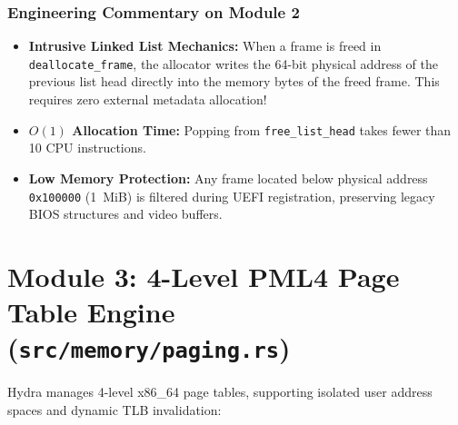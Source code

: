 \subsubsection*{Engineering Commentary on Module 2}
\begin{itemize}
    \item \textbf{Intrusive Linked List Mechanics:} When a frame is freed in \texttt{deallocate\_frame}, the allocator writes the 64-bit physical address of the previous list head directly into the memory bytes of the freed frame. This requires zero external metadata allocation!
    \item \textbf{$O(1)$ Allocation Time:} Popping from \texttt{free\_list\_head} takes fewer than 10 CPU instructions.
    \item \textbf{Low Memory Protection:} Any frame located below physical address \texttt{0x100000} (1~MiB) is filtered during UEFI registration, preserving legacy BIOS structures and video buffers.
\end{itemize}

\section{Module 3: 4-Level PML4 Page Table Engine (\texttt{src/memory/paging.rs})}
\label{sec:tour_paging_annotated}

Hydra manages 4-level x86\_64 page tables, supporting isolated user address spaces and dynamic TLB invalidation:


